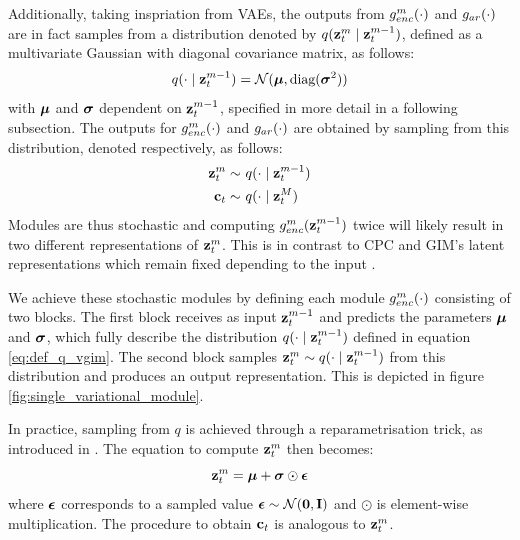 			Additionally, taking inspriation from VAEs, the outputs from $g_{enc}^m(\cdot)$ and $g_{ar}(\cdot)$ are in fact samples from a distribution denoted by $q(\mathbf{z}_t^m \mid \mathbf{z}_t^{m-1})$, defined as a multivariate Gaussian with diagonal covariance matrix, as follows:
			\begin{equation}
				q(\cdot \mid \mathbf{z}_t^{m-1}) = \mathcal{N}(\bm{\mu}, \text{diag}(\bm{\sigma}^2)) \label{eq:def_q_vgim}
			\end{equation}
			with $\bm{\mu}$ and $\bm{\sigma}$ dependent on $\mathbf{z}_t^{m-1}$, specified in more detail in a following subsection.
			The outputs for $g_{enc}^m(\cdot)$ and $g_{ar}(\cdot)$ are obtained by sampling from this distribution, denoted respectively, as follows:
 			\begin{align} %
			 	\sample{\zt^m}~ & \qfromzmneg  \label{eq:sample_z_from_q} \\
			 	\sample{\ct}~ & \qfromzM
			 \end{align}
			Modules are thus stochastic and computing $g_{enc}^m(\mathbf{z}_t^{m-1})$ twice will likely result in two different representations of $\mathbf{z}_t^m$. This is in contrast to CPC and GIM's latent representations which remain fixed depending to the input \cite{oordRepresentationLearningContrastive2019, lowePuttingEndEndtoEnd2020}.
		
			We achieve these stochastic modules by defining each module $g_{enc}^m(\cdot)$ consisting of two blocks. The first block receives as input $\mathbf{z}_t^{m-1}$ and predicts the parameters $\bm{\mu}$ and $\bm{\sigma}$, which fully describe the distribution $q(\cdot \mid \mathbf{z}_t^{m-1})$ defined in equation \ref{eq:def_q_vgim}. The second block samples $\mathbf{z}_t^m \sim q(\cdot \mid \mathbf{z}_t^{m-1})$ from this distribution and produces an output representation. This is depicted in figure \ref{fig:single_variational_module}.
			
			
			
			In practice, sampling from $q$ is achieved through a reparametrisation trick, as introduced in \cite{kingmaAutoEncodingVariationalBayes2022}. The equation to compute $\mathbf{z}_t^m$ then becomes:
			\begin{equation*}
				\mathbf{z}_t^m = \bm{\mu} + \bm{\sigma} \odot \bm{\epsilon}
			\end{equation*}
			where $\bm{\epsilon}$ corresponds to a sampled value $\bm{\epsilon} \sim \mathcal{N}(\bm{\mathbf{0}}, \mathbf{I})$ and $\odot$ is element-wise multiplication. The procedure to obtain $\mathbf{c}_t$ is analogous to $\mathbf{z}_t^m$.
			
